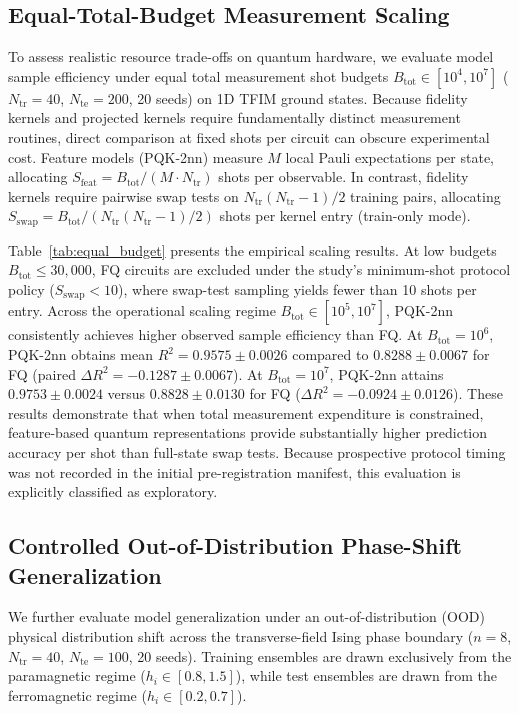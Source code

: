 \documentclass[conference]{IEEEtran}
\begin{document}
\subsection{Equal-Total-Budget Measurement Scaling}
\label{sec:equal_budget}
To assess realistic resource trade-offs on quantum hardware, we evaluate model sample efficiency under equal total measurement shot budgets $B_{\mathrm{tot}} \in [10^4, 10^7]$ ($N_{\mathrm{tr}}=40$, $N_{\mathrm{te}}=200$, 20 seeds) on 1D TFIM ground states. Because fidelity kernels and projected kernels require fundamentally distinct measurement routines, direct comparison at fixed shots per circuit can obscure experimental cost. Feature models (PQK-2nn) measure $M$ local Pauli expectations per state, allocating $S_{\mathrm{feat}} = B_{\mathrm{tot}} / (M \cdot N_{\mathrm{tr}})$ shots per observable. In contrast, fidelity kernels require pairwise swap tests on $N_{\mathrm{tr}}(N_{\mathrm{tr}}-1)/2$ training pairs, allocating $S_{\mathrm{swap}} = B_{\mathrm{tot}} / (N_{\mathrm{tr}}(N_{\mathrm{tr}}-1)/2)$ shots per kernel entry (train-only mode).

Table~\ref{tab:equal_budget} presents the empirical scaling results. At low budgets $B_{\mathrm{tot}} \le 30{,}000$, FQ circuits are excluded under the study's minimum-shot protocol policy ($S_{\mathrm{swap}} < 10$), where swap-test sampling yields fewer than 10 shots per entry. Across the operational scaling regime $B_{\mathrm{tot}} \in [10^5, 10^7]$, PQK-2nn consistently achieves higher observed sample efficiency than FQ. At $B_{\mathrm{tot}}=10^6$, PQK-2nn obtains mean $R^2 = 0.9575 \pm 0.0026$ compared to $0.8288 \pm 0.0067$ for FQ (paired $\Delta R^2 = -0.1287 \pm 0.0067$). At $B_{\mathrm{tot}}=10^7$, PQK-2nn attains $0.9753 \pm 0.0024$ versus $0.8828 \pm 0.0130$ for FQ ($\Delta R^2 = -0.0924 \pm 0.0126$). These results demonstrate that when total measurement expenditure is constrained, feature-based quantum representations provide substantially higher prediction accuracy per shot than full-state swap tests. Because prospective protocol timing was not recorded in the initial pre-registration manifest, this evaluation is explicitly classified as exploratory.



\subsection{Controlled Out-of-Distribution Phase-Shift Generalization}
\label{sec:ood}
We further evaluate model generalization under an out-of-distribution (OOD) physical distribution shift across the transverse-field Ising phase boundary ($n=8$, $N_{\mathrm{tr}}=40$, $N_{\mathrm{te}}=100$, 20 seeds). Training ensembles are drawn exclusively from the paramagnetic regime ($h_i \in [0.8, 1.5]$), while test ensembles are drawn from the ferromagnetic regime ($h_i \in [0.2, 0.7]$).
\end{document}
